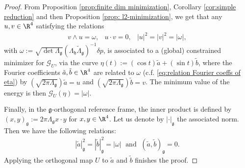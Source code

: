\begin{proof}
From Proposition \ref{prop:finite dim minimization}, Corollary \ref{cor:simple reduction} and then Proposition \ref{prop: l2-minimization}, we get that any $u, v \in \R^4$ satisfying the relations
\begin{eqnarray}
v \wedge u = \omega,  &  u \cdot v = 0, &  |u|^2 = |v|^2 =  |\omega|,
\end{eqnarray}
 with $\omega := \sqrt{\det \Lambda_{\mathfrak{g}}} (\Lambda_{\mathfrak{h}} \tilde{\Lambda}_{\mathfrak{g}})^{-1} \delta p$, is associated to a (global) constrained minimizer for $\mathcal{G}_{U}$, via the curve $\eta(t) := (\cos t) \tilde{a} + (\sin t) \tilde{b}$, where the Fourier coefficients $\tilde{a}, \tilde{b} \in \R^4$ are related to $\omega$ (c.f. \ref{eq:relation Fourier coeffs of eta}) by $(\sqrt{2 \pi \Lambda_{\mathfrak{g}}}) \tilde{a} = u$ and $(\sqrt{2 \pi \Lambda_{\mathfrak{g}}}) \tilde{b} = v$. The minimum value of the energy is then $\mathcal{G}_{U}(\eta) = |\omega|$.

Finally, in the $\mathfrak{g}$-orthogonal reference frame, the inner product is defined by $(x, y)_{\mathfrak{g}} := 2 \pi \Lambda_{\mathfrak{g}}x \cdot y$ for $x,y \in \R^4$. Let us denote by $|\cdot|_{\mathfrak{g}}$ the associated norm. Then we have the following relations:
\begin{align}
|\tilde{a}|_{\mathfrak{g}}^2 = |\tilde{b}|_{\mathfrak{g}}^{2} = |\omega| \;  \text{ and } \; (\tilde{a}, \tilde{b})_{\mathfrak{g}} = 0.
\end{align}
Applying the orthogonal map $U$ to $\tilde{a}$ and $\tilde{b}$ finishes the proof.
\end{proof}

